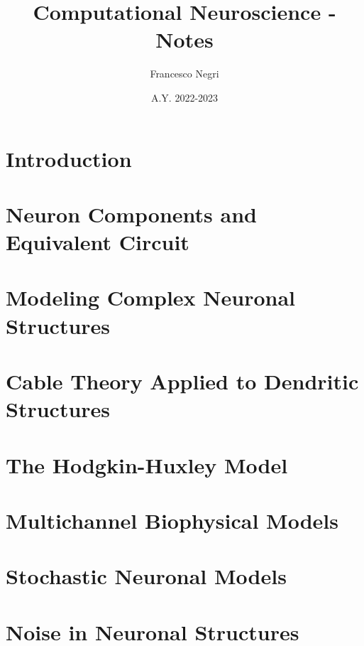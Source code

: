 \documentclass[12pt]{article}
\title{Computational Neuroscience - Notes}
\author{Francesco Negri}
\date{A.Y. 2022-2023}
\begin{document}
\maketitle

\tableofcontents
\newpage

\section{Introduction}
\graphicspath{ {./images/01/} }

\newpage

\section{Neuron Components and Equivalent Circuit}
\graphicspath{ {./images/02/} }

\newpage

\section{Modeling Complex Neuronal Structures}
\graphicspath{ {./images/03/} }

\newpage

\section{Cable Theory Applied to Dendritic Structures}
\graphicspath{ {./images/04/} }

\newpage

\section{The Hodgkin-Huxley Model}
\graphicspath{ {./images/05/} }

\newpage

\section{Multichannel Biophysical Models}
\graphicspath{ {./images/06/} }

\newpage

\section{Stochastic Neuronal Models}
\graphicspath{ {./images/07/} }

\newpage

\section{Noise in Neuronal Structures}
\graphicspath{ {./images/08/} }

\newpage
\end{document}
